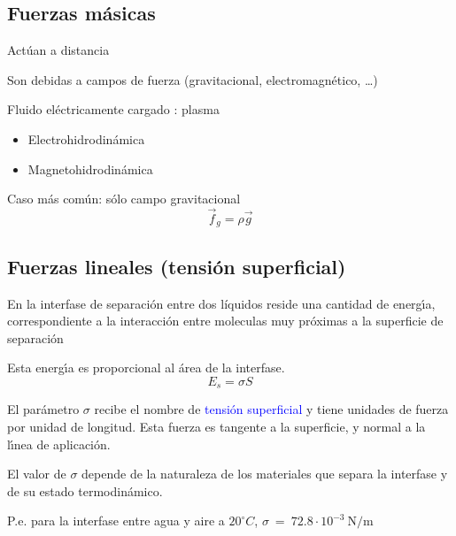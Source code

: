 \subsection{Fuerzas m\'asicas}
Act\'uan a distancia

Son debidas a campos de fuerza (gravitacional, electromagn\'etico, \ldots)

Fluido el\'ectricamente cargado : plasma
\begin{itemize}
	\item Electrohidrodin\'amica
	\item Magnetohidrodin\'amica
\end{itemize}

Caso m\'as com\'un: s\'olo campo gravitacional
$$\vec f_g = \rho \vec g$$

\subsection{Fuerzas lineales (tensi\'on superficial)}
En la interfase de separaci\'on entre dos l\'iquidos reside una cantidad de energ\'{\i}a, correspondiente
a la interacci\'on entre moleculas muy pr\'oximas a la superficie de separaci\'on

Esta energ\'{\i}a es proporcional al \'area de la interfase.
$$ E_s = \sigma S $$

El par\'ametro $\sigma$ recibe el nombre de \textcolor{blue}{tensi\'on superficial} y tiene unidades de fuerza por
unidad de longitud. Esta fuerza es tangente a la superficie, y normal a la l\'{\i}nea de aplicaci\'on.

El valor de $\sigma$ depende de la naturaleza de los materiales que separa la interfase y de su estado termodin\'amico.

P.e. para la interfase entre agua y aire a $20^\circ C$, $\sigma~=~72.8\cdot10^{-3}~\text{N/m}$


